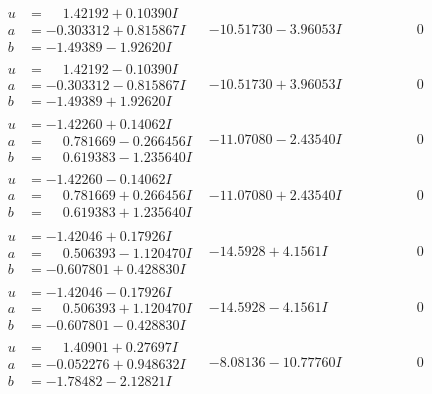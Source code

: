 \documentclass[1p]{elsarticle_modified}
\theoremstyle{definition}
\begin{document}
$$\begin{array}{c|c|c}
\begin{aligned}
u &= \phantom{-}1.42192 + 0.10390 I \\
a &= -0.303312 + 0.815867 I \\
b &= -1.49389 - 1.92620 I\end{aligned}
 & -10.51730 - 3.96053 I & \phantom{-0.000000 } 0 \\ \hline\begin{aligned}
u &= \phantom{-}1.42192 - 0.10390 I \\
a &= -0.303312 - 0.815867 I \\
b &= -1.49389 + 1.92620 I\end{aligned}
 & -10.51730 + 3.96053 I & \phantom{-0.000000 } 0 \\ \hline\begin{aligned}
u &= -1.42260 + 0.14062 I \\
a &= \phantom{-}0.781669 - 0.266456 I \\
b &= \phantom{-}0.619383 - 1.235640 I\end{aligned}
 & -11.07080 - 2.43540 I & \phantom{-0.000000 } 0 \\ \hline\begin{aligned}
u &= -1.42260 - 0.14062 I \\
a &= \phantom{-}0.781669 + 0.266456 I \\
b &= \phantom{-}0.619383 + 1.235640 I\end{aligned}
 & -11.07080 + 2.43540 I & \phantom{-0.000000 } 0 \\ \hline\begin{aligned}
u &= -1.42046 + 0.17926 I \\
a &= \phantom{-}0.506393 - 1.120470 I \\
b &= -0.607801 + 0.428830 I\end{aligned}
 & -14.5928 + 4.1561 I & \phantom{-0.000000 } 0 \\ \hline\begin{aligned}
u &= -1.42046 - 0.17926 I \\
a &= \phantom{-}0.506393 + 1.120470 I \\
b &= -0.607801 - 0.428830 I\end{aligned}
 & -14.5928 - 4.1561 I & \phantom{-0.000000 } 0 \\ \hline\begin{aligned}
u &= \phantom{-}1.40901 + 0.27697 I \\
a &= -0.052276 + 0.948632 I \\
b &= -1.78482 - 2.12821 I\end{aligned}
 & -8.08136 - 10.77760 I & \phantom{-0.000000 } 0 \\ \hline\begin{aligned}

\end{aligned}
\end{array}$$
\end{document}
